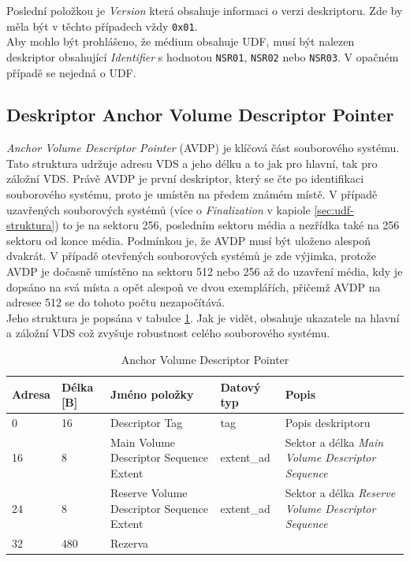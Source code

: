 Poslední položkou je \textit{Version} která obsahuje informaci o verzi deskriptoru. Zde by měla být v těchto případech vždy \texttt{0x01}.\\
Aby mohlo být prohlášeno, že médium obsahuje UDF, musí být nalezen deskriptor obsahující \textit{Identifier} s hodnotou \texttt{NSR01}, \texttt{NSR02} nebo \texttt{NSR03}. V opačném případě se nejedná o UDF.

\subsection{Deskriptor Anchor Volume Descriptor Pointer}
\label{subsec:avdp}
\textit{Anchor Volume Descriptor Pointer} (AVDP) je klíčová část souborového systému. Tato struktura udržuje adresu VDS a jeho délku a to jak pro hlavní, tak pro záložní VDS. Právě AVDP je první deskriptor, který se čte po identifikaci souborového systému, proto je umístěn na předem známém místě. V případě uzavřených souborových systémů (více o \textit{Finalization} v kapiole \ref{sec:udf-struktura}) to je na sektoru 256, posledním sektoru média a nezřídka také na 256 sektoru od konce média. Podmínkou je, že AVDP musí být uloženo alespoň dvakrát. V případě otevřených souborových systémů je zde výjimka, protože AVDP je dočasně umístěno na sektoru 512 nebo 256 až do uzavření média, kdy je dopsáno na svá místa a opět alespoň ve dvou exemplářích, přičemž AVDP na adresee 512 se do tohoto počtu nezapočítává.\\
Jeho struktura je popsána v tabulce \ref{tab:avdp}. Jak je vidět, obsahuje ukazatele na hlavní a záložní VDS což zvyšuje robustnost celého souborového systému.
\begin{table}[]
    \centering
    \begin{tabular}{ | l | l | p{4.2cm} | p{1.8cm} | p{5.5cm} | }
        \hline
        Adresa  & Délka [B]   & Jméno položky & Datový typ    & Popis \\ \hline\hline
        0       & 16          & Descriptor Tag & tag        & Popis deskriptoru \\ \hline
        16      & 8           & Main Volume Descriptor Sequence Extent & extent\_ad & Sektor a délka \textit{Main Volume Descriptor Sequence} \\ \hline
        24      & 8           & Reserve Volume Descriptor Sequence Extent & extent\_ad & Sektor a délka \textit{Reserve Volume Descriptor Sequence} \\ \hline
        32      & 480         & Rezerva & & \\ \hline
    \end{tabular}
    \caption{Anchor Volume Descriptor Pointer\label{tab:avdp}}
\end{table}


